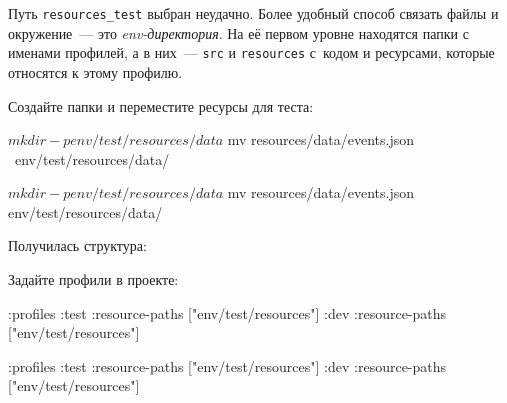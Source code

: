 
Путь \verb|resources_test| выбран неудачно. Более удобный способ связать файлы
и окружение~--- это \emph{env-директория}. На её первом уровне находятся папки с
именами профилей, а в них~--- \verb|src| и \verb|resources| с~кодом и
ресурсами, которые относятся к этому профилю.

Создайте папки и переместите ресурсы для теста:

\ifx\devicetype\mobile

\begin{english}
  \begin{bash}
$ mkdir -p env/test/resources/data
$ mv resources/data/events.json \
     env/test/resources/data/
  \end{bash}
\end{english}

\else

\begin{english}
  \begin{bash}
$ mkdir -p env/test/resources/data
$ mv resources/data/events.json env/test/resources/data/
  \end{bash}
\end{english}

\fi

\noindent
Получилась структура:

\begin{english}
\end{english}


\linegap

\noindent
Задайте профили в проекте:

\ifx\devicetype\mobile

\begin{english}
  \begin{clojure}
:profiles {:test {:resource-paths
                  ["env/test/resources"]}
           :dev {:resource-paths
                 ["env/test/resources"]}}
  \end{clojure}
\end{english}

\else

\begin{english}
  \begin{clojure}
:profiles {:test {:resource-paths ["env/test/resources"]}
           :dev  {:resource-paths ["env/test/resources"]}}
  \end{clojure}
\end{english}

